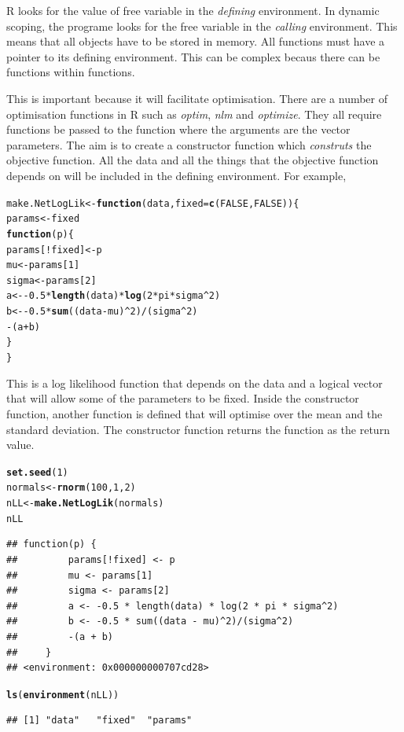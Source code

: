 \documentclass{article}\usepackage{graphicx, color}
\makeatletter
\newcommand{\hlfunctioncall}[1]{\textcolor[rgb]{0.501960784313725,0,0.329411764705882}{\textbf{#1}}}%
\newenvironment{kframe}{%
 \def\at@end@of@kframe{}%
 \ifinner\ifhmode%
  \def\at@end@of@kframe{\end{minipage}}%
  \begin{minipage}{\columnwidth}%
 \fi\fi%
 \def\FrameCommand##1{\hskip\@totalleftmargin \hskip-\fboxsep
 \colorbox{shadecolor}{##1}\hskip-\fboxsep
     \hskip-\linewidth \hskip-\@totalleftmargin \hskip\columnwidth}%
 \MakeFramed {\advance\hsize-\width
   \@totalleftmargin\z@ \linewidth\hsize
   \@setminipage}}%
 {\par\unskip\endMakeFramed%
 \at@end@of@kframe}
\newenvironment{knitrout}{}{} %
\makeatother
\begin{document}
R looks for the value of free variable in the \emph{defining} environment.  In dynamic scoping, the programe looks for the free variable in the \emph{calling} environment. This means that all objects have to be stored in memory. All functions must have a pointer to its defining environment.  This can be complex becaus there can be functions within functions. 

This is important because it will facilitate optimisation. There are a number of optimisation functions in R such as \emph{optim}, \emph{nlm} and \emph{optimize}.  They all require functions be passed to the function where the arguments are the vector parameters. The aim is to create a constructor function which \emph{construts} the objective function.  All the data and all the things that the objective function depends on will be included in the defining environment. For example, 
\begin{knitrout}
\color{fgcolor}\begin{kframe}
\begin{alltt}
make.NetLogLik <- \hlfunctioncall{function}(data, fixed = \hlfunctioncall{c}(FALSE, FALSE)) \{
    params <- fixed
    \hlfunctioncall{function}(p) \{
        params[!fixed] <- p
        mu <- params[1]
        sigma <- params[2]
        a <- -0.5 * \hlfunctioncall{length}(data) * \hlfunctioncall{log}(2 * pi * sigma^2)
        b <- -0.5 * \hlfunctioncall{sum}((data - mu)^2)/(sigma^2)
        -(a + b)
    \}
\}
\end{alltt}
\end{kframe}
\end{knitrout}

This is a log likelihood function that depends on the data and a logical vector that will allow some of the parameters to be fixed.  Inside the constructor function, another function is defined that will optimise over the mean and the standard deviation. The constructor function returns the function as the return value. 
\begin{knitrout}
\color{fgcolor}\begin{kframe}
\begin{alltt}
\hlfunctioncall{set.seed}(1)
normals <- \hlfunctioncall{rnorm}(100, 1, 2)
nLL <- \hlfunctioncall{make.NetLogLik}(normals)
nLL
\end{alltt}
\begin{verbatim}
## function(p) {
##         params[!fixed] <- p
##         mu <- params[1]
##         sigma <- params[2]
##         a <- -0.5 * length(data) * log(2 * pi * sigma^2)
##         b <- -0.5 * sum((data - mu)^2)/(sigma^2)
##         -(a + b)
##     }
## <environment: 0x000000000707cd28>
\end{verbatim}
\begin{alltt}
\hlfunctioncall{ls}(\hlfunctioncall{environment}(nLL))
\end{alltt}
\begin{verbatim}
## [1] "data"   "fixed"  "params"
\end{verbatim}
\end{kframe}
\end{knitrout}
\end{document}
